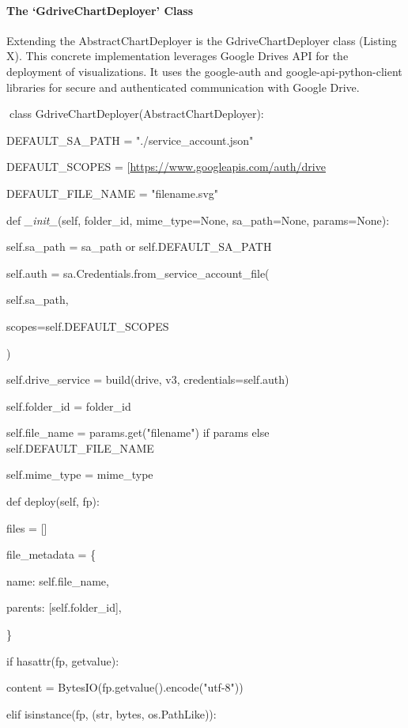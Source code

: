 \documentclass[
]{article}
\begin{document}
\paragraph{The `GdriveChartDeployer'
Class}\label{the-gdrivechartdeployer-class}

Extending the AbstractChartDeployer is the GdriveChartDeployer class
(Listing X). This concrete implementation leverages Google
Drive\textquotesingle s API for the deployment of visualizations. It
uses the google-auth and google-api-python-client libraries for secure
and authenticated communication with Google Drive.

class GdriveChartDeployer(AbstractChartDeployer):

DEFAULT\_SA\_PATH = "./service\_account.json"

DEFAULT\_SCOPES =
{[}\textquotesingle{}\url{https://www.googleapis.com/auth/drive}\textquotesingle{]}

DEFAULT\_FILE\_NAME = "filename.svg"

def \emph{\_init\_}(self, folder\_id, mime\_type=None, sa\_path=None,
params=None):

self.sa\_path = sa\_path or self.DEFAULT\_SA\_PATH

self.auth = sa.Credentials.from\_service\_account\_file(

self.sa\_path,

scopes=self.DEFAULT\_SCOPES

)

self.drive\_service = build(\textquotesingle drive\textquotesingle,
\textquotesingle v3\textquotesingle, credentials=self.auth)

self.folder\_id = folder\_id

self.file\_name = params.get("filename") if params else
self.DEFAULT\_FILE\_NAME

self.mime\_type = mime\_type

def deploy(self, fp):

files = {[}{]}

file\_metadata = \{

\textquotesingle name\textquotesingle: self.file\_name,

\textquotesingle parents\textquotesingle: {[}self.folder\_id{]},

\}

if hasattr(fp, \textquotesingle getvalue\textquotesingle):

content = BytesIO(fp.getvalue().encode("utf-8"))

elif isinstance(fp, (str, bytes, os.PathLike)):
\end{document}
